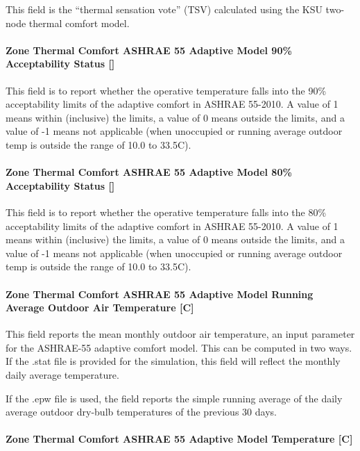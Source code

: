 This field is the ``thermal sensation vote'' (TSV) calculated using the KSU two-node thermal comfort model.

\paragraph{Zone Thermal Comfort ASHRAE 55 Adaptive Model 90\% Acceptability Status {[]}}\label{zone-thermal-comfort-ashrae-55-adaptive-model-90-acceptability-status}

This field is to report whether the operative temperature falls into the 90\% acceptability limits of the adaptive comfort in ASHRAE 55-2010. A value of 1 means within (inclusive) the limits, a value of 0 means outside the limits, and a value of -1 means not applicable (when unoccupied or running average outdoor temp is outside the range of 10.0 to 33.5C).

\paragraph{Zone Thermal Comfort ASHRAE 55 Adaptive Model 80\% Acceptability Status {[]}}\label{zone-thermal-comfort-ashrae-55-adaptive-model-80-acceptability-status}

This field is to report whether the operative temperature falls into the 80\% acceptability limits of the adaptive comfort in ASHRAE 55-2010. A value of 1 means within (inclusive) the limits, a value of 0 means outside the limits, and a value of -1 means not applicable (when unoccupied or running average outdoor temp is outside the range of 10.0 to 33.5C).

\paragraph{Zone Thermal Comfort ASHRAE 55 Adaptive Model Running Average Outdoor Air Temperature {[}C{]}}\label{zone-thermal-comfort-ashrae-55-adaptive-model-running-average-outdoor-air-temperature-c}

This field reports the mean monthly outdoor air temperature, an input parameter for the ASHRAE-55 adaptive comfort model. This can be computed in two ways. If the .stat file is provided for the simulation, this field will reflect the monthly daily average temperature.

If the .epw file is used, the field reports the simple running average of the daily average outdoor dry-bulb temperatures of the previous 30 days.

\paragraph{Zone Thermal Comfort ASHRAE 55 Adaptive Model Temperature {[}C{]}}\label{zone-thermal-comfort-ashrae-55-adaptive-model-temperature-c}

